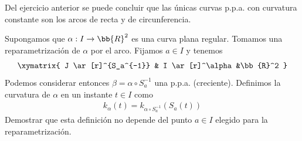 \begin{observacion}
    Del ejercicio anterior se puede concluir que las únicas curvas p.p.a. con curvatura constante son los arcos de recta y de circunferencia.
\end{observacion}

\begin{ejercicio}
    Supongamos que $\alpha:I\to \bb{R}^2$ es una curva plana regular. Tomamos una reparametrización de $\alpha$ por el arco. Fijamos $a\in I$ y tenemos
    \begin{gather*}
        \xymatrix{
            J  \ar[r]^{S_a^{-1}} & I \ar[r]^\alpha &\bb{R}^2 
        }
    \end{gather*}
    Podemos considerar entonces $\beta = \alpha \circ S_a^{-1}$ una p.p.a. (creciente). Definimos la curvatura de $\alpha$ en un instante $t\in I$ como 
    \begin{gather*}
        k_\alpha(t) = k_{\alpha \circ S_a^{-1}}(S_a(t))
    \end{gather*}
    Demostrar que esta definición no depende del punto $a\in I$ elegido para la reparametrización.\\


\end{ejercicio}
